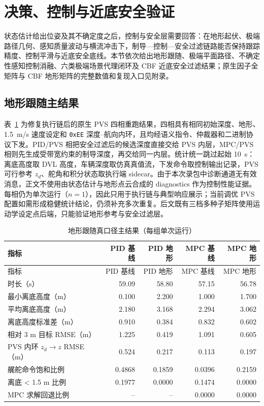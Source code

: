 \section{决策、控制与近底安全验证}\label{sec:ch05-5-ctrl}

状态估计给出位姿及其不确定度之后，控制与安全层需要回答：在地形起伏、极端路径几何、感知质量波动与横流冲击下，制导—控制—安全过滤链路能否保持跟踪精度、控制平滑与近底安全底线。本节依次给出地形跟随、极端平面路径、不确定性感知控制消融、六类极端场景代理闭环及 CBF 近底安全过滤结果；原生因子全矩阵与 CBF 地形矩阵的完整数值和复现入口见附录。

\subsection{地形跟随主结果}\label{sec:ch05-5-5-2}

表~\ref{tab:ch05-terrain-main} 为修复执行链后的原生 PVS 四相重跑结果，四相具有相同初始深度、地形、1.5~m/s 速度设定和 \texttt{0xEE} 深度--航向内环，且均经语义指令、仲裁器和二进制协议下发。PID/PVS 相把安全过滤后的候选深度直接交给 PVS 内层，MPC/PVS 相则先生成受带宽约束的制导深度，再交给同一内层。统计统一跳过起始 10~s：离底高度取 DVL 高度，车辆深度取仿真真值流，下发命令取控制输出记录，PVS 可行参考 \(z_d\)、舵角和积分状态取执行端 sidecar。由于本次录包中诊断通道无有效消息，正文不使用由状态估计与地形点云合成的 diagnostics 作为控制性能证据。每相仍为单次运行（\(n=1\)），因此只用于执行链与典型响应展示；当前调优 PVS 配置如需形成稳健统计结论，仍须补充多次重复。后文既有三档多种子矩阵使用运动学设定点后端，只能验证地形参考与安全过滤层。

\begin{longtable}[]{@{}lrrrr@{}}
\caption{地形跟随真口径主结果（每组单次运行）}\label{tab:ch05-terrain-main}\tabularnewline
\toprule\noalign{}
指标 & PID 基线 & PID 地形 & MPC 基线 & MPC 地形 \\
\midrule\noalign{}
\endfirsthead
\toprule\noalign{}
指标 & PID 基线 & PID 地形 & MPC 基线 & MPC 地形 \\
\midrule\noalign{}
\endhead
\bottomrule\noalign{}
\endlastfoot
时长（s） & 59.09 & 58.80 & 57.15 & 56.78 \\
最小离底高度（m） & 0.100 & 2.200 & 1.000 & 1.700 \\
平均离底高度（m） & 2.180 & 3.168 & 2.294 & 3.062 \\
离底高度标准差（m） & 0.910 & 0.384 & 0.832 & 0.602 \\
相对 3 m 目标 RMSE（m） & 1.225 & 0.419 & 1.091 & 0.605 \\
PVS 内环 \(z_d\!\rightarrow z\) RMSE（m） & 0.524 & 0.217 & 0.113 & 0.197 \\
艉舵命令饱和比例 & 0.4868 & 0.1859 & 0.0396 & 0.2159 \\
离底 \textless{} 1.5 m 比例 & 0.1977 & 0.0000 & 0.1474 & 0.0000 \\
MPC 求解回退比例 & -- & -- & 0.0000 & 0.0000 \\
\end{longtable}

